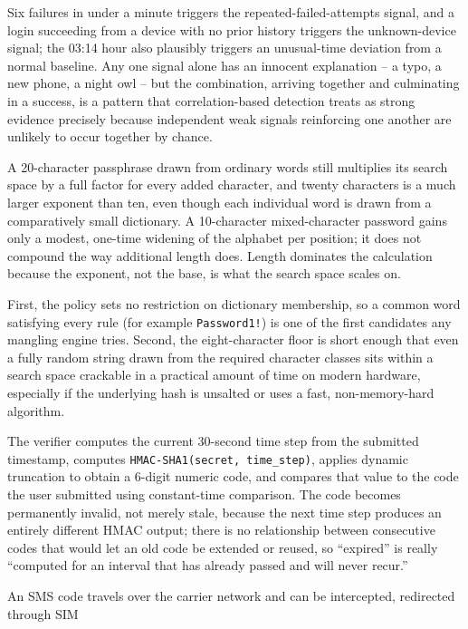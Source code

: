 \begin{answerkey}
\item Six failures in under a minute triggers the repeated-failed-attempts signal, and a login
succeeding from a device with no prior history triggers the unknown-device signal; the 03:14 hour
also plausibly triggers an unusual-time deviation from a normal baseline. Any one signal alone has
an innocent explanation -- a typo, a new phone, a night owl -- but the combination, arriving
together and culminating in a success, is a pattern that correlation-based detection treats as
strong evidence precisely because independent weak signals reinforcing one another are unlikely to
occur together by chance.
\item A 20-character passphrase drawn from ordinary words still multiplies its search space by a
full factor for every added character, and twenty characters is a much larger exponent than ten,
even though each individual word is drawn from a comparatively small dictionary. A 10-character
mixed-character password gains only a modest, one-time widening of the alphabet per position; it
does not compound the way additional length does. Length dominates the calculation because the
exponent, not the base, is what the search space scales on.
\item First, the policy sets no restriction on dictionary membership, so a common word satisfying
every rule (for example \texttt{Password1!}) is one of the first candidates any mangling engine
tries. Second, the eight-character floor is short enough that even a fully random string drawn from
the required character classes sits within a search space crackable in a practical amount of time
on modern hardware, especially if the underlying hash is unsalted or uses a fast, non-memory-hard
algorithm.
\item The verifier computes the current 30-second time step from the submitted timestamp, computes
\texttt{HMAC-SHA1(secret, time\_step)}, applies dynamic truncation to obtain a 6-digit numeric
code, and compares that value to the code the user submitted using constant-time comparison. The
code becomes permanently invalid, not merely stale, because the next time step produces an
entirely different HMAC output; there is no relationship between consecutive codes that would let
an old code be extended or reused, so ``expired'' is really ``computed for an interval that has
already passed and will never recur.''
\item An SMS code travels over the carrier network and can be intercepted, redirected through SIM

\end{answerkey}
